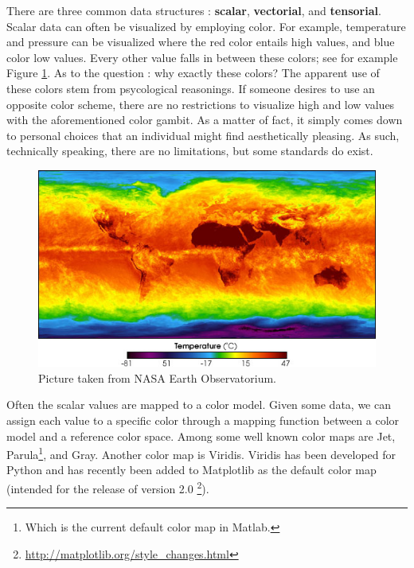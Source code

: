 \documentclass[main.tex]{subfiles}
\begin{document}
There are three common data structures : \textbf{scalar}, \textbf{vectorial}, and \textbf{tensorial}. 
Scalar data can often be visualized by employing color. For example, temperature and pressure can 
be visualized where the red color entails high values, and blue color low values. Every other value 
falls in between these colors; see for example Figure \ref{fig:nasa_temp}. As to the question : 
why exactly these colors? The apparent use of these colors stem from psycological 
reasonings. If someone desires to use an opposite color scheme, there are no restrictions to
visualize high and low values with the aforementioned color gambit. As a matter of fact,
it simply comes down to personal choices that an individual might find aesthetically pleasing.
As such, technically speaking, there are no limitations, but some standards do exist.
\begin{figure}
\hspace{35mm}\includegraphics[scale=0.55,natwidth=540,natheight=315]{../figures/temperature_nasa.jpg} 
\caption[Color map of temperatures of Earth.]
{Picture taken from NASA Earth Observatorium.\footnotemark}
\label{fig:nasa_temp}
\end{figure}

Often the scalar values are mapped to a color model. Given some data, we can 
assign each value to a specific color through a mapping function between a color model and a 
reference color space. Among some well known color maps are Jet, Parula\footnote{Which is the 
current default color map in Matlab.}, and Gray. Another color map is Viridis. Viridis has been 
developed for Python and has recently been added to Matplotlib as the default color map 
(intended for the release of version 2.0 \footnote{\url{http://matplotlib.org/style_changes.html}}).
\end{document}
